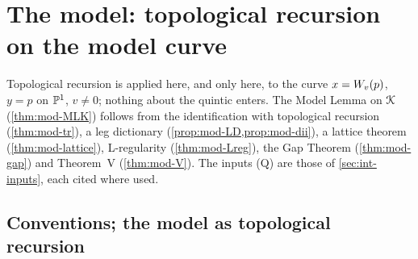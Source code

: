 \section{The model: topological recursion on the model curve}
\label{sec:mod}

Topological recursion is applied here, and only here, to the curve $x=W_{v}(p)$, $y=p$ on $\mathbb{P}^1$, $v\neq 0$; nothing about the quintic enters. The Model Lemma on $\mathcal{K}$ (\cref{thm:mod-MLK}) follows from the identification with topological recursion (\cref{thm:mod-tr}), a leg dictionary (\cref{prop:mod-LD,prop:mod-dii}), a lattice theorem (\cref{thm:mod-lattice}), L-regularity (\cref{thm:mod-Lreg}), the Gap Theorem (\cref{thm:mod-gap}) and Theorem~V (\cref{thm:mod-V}). The inputs (Q) are those of \cref{sec:int-inputs}, each cited where used.

\subsection{Conventions; the model as topological recursion}
\label{sec:mod-tr}

